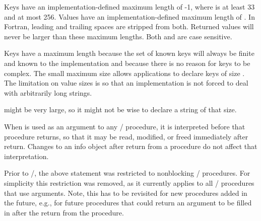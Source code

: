 \begin{sloppy}
Keys have an implementation-defined maximum length of
-1,
where  is at least 33 and at most 256.
Values have an implementation-defined maximum length of
.  
In Fortran, leading and trailing spaces are stripped from
both.  Returned values will never be larger than these maximum
lengths.
Both  and  are case sensitive.

\end{sloppy}

\begin{rationale}
Keys have a maximum length because the set of known keys will always
be finite and known to the implementation and because there is no
reason for keys to be complex.  The small maximum size allows
applications to declare keys of size .
The limitation on value sizes is so that an implementation is not
forced to deal with arbitrarily long
strings.
\end{rationale}
\begin{users}
 might be very large, so it
might not be wise to declare a string of that size.
\end{users}

When  is used as an argument to any \MPI/ procedure, it
is interpreted before that procedure returns, so that it may
be read, modified, or freed immediately after return.
Changes to an info object after return from a procedure do not affect
that interpretation.

\begin{rationale}
Prior to \mpiivdoto/, the above statement was restricted to nonblocking \MPI/ procedures.
For simplicity this restriction was removed, as it currently applies to all \MPI/
procedures that use  arguments. Note, this has to be revisited for new
procedures added in the future, e.g., for future procedures that could return an 
argument to be filled in after the return from the procedure.
\end{rationale}


